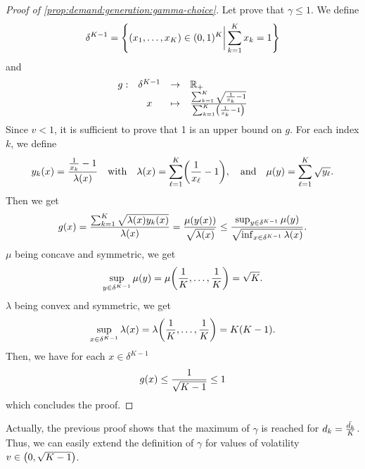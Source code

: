 \begin{proof}[Proof of \cref{prop:demand:generation:gamma-choice}]
Let prove that $\gamma\le 1$.
We define
\begin{equation}
  \delta^{K-1} = \crbracket{\bracket{x_1,\ldots,x_K}\in\bracket{0,1}^K \bigg| \sum_{k=1}^K x_k = 1}
\end{equation}
and
\begin{equation}
  \begin{array}{rccl}
  g: & \delta^{K-1} & \rightarrow & \RR_+ \\
     & x & \mapsto & \frac{\sum_{k=1}^K\sqrt{\frac{1}{x_k}-1}}{\sum_{k=1}^K\bracket{\frac{1}{x_k}-1}}
  \end{array}
\end{equation}
Since $v<1$, it is sufficient to prove that 1 is an upper bound on $g$. For each index $k$, we define
\begin{equation}
  y_k\bracket{x} = \frac{\frac{1}{x_k}-1}{\lambda\bracket{x}}
  \quad\mbox{with}\quad
  \lambda\bracket{x} = \sum_{\ell=1}^K\bracket{\frac{1}{x_{\ell}}-1}
  ,\quad\mbox{and}\quad 
  \mu\bracket{y} = \sum_{\ell=1}^K \sqrt{y_{\ell}}.
\end{equation}
Then we get
\begin{equation}
  g\bracket{x} = \frac{\sum_{k=1}^K\sqrt{\lambda\bracket{x}y_k\bracket{x}}}{\lambda\bracket{x}}
  = \frac{\mu\bracket{y\bracket{x}}}{\sqrt{\lambda\bracket{x}}}
  \le \frac{\sup_{y\in\delta^{K-1}}\mu\bracket{y}}{\sqrt{\inf_{x\in\delta^{K-1}}\lambda\bracket{x}}}.
\end{equation}
$\mu$ being concave and symmetric, we get
\begin{equation}
  \sup_{y\in\delta^{K-1}}\mu\bracket{y} = \mu\bracket{\frac{1}{K},\ldots,\frac{1}{K}} = \sqrt{K}.
\end{equation}
$\lambda$ being convex and symmetric, we get
\begin{equation}
  \sup_{x\in\delta^{K-1}}\lambda\bracket{x} = \lambda\bracket{\frac{1}{K},\ldots,\frac{1}{K}} = K\bracket{K-1}.
\end{equation}
Then, we have for each $x\in\delta^{K-1}$
\begin{equation}
  g\bracket{x} \le \frac{1}{\sqrt{K-1}} \le 1
\end{equation}
which concludes the proof.
\end{proof}


\begin{rmq}
  Actually, the previous proof shows that the maximum of $\gamma$ is reached for $d_k=\frac{\bar{d_k}}{K}$. Thus, we can easily extend the definition of $\gamma$ for values of volatility $v\in\bracket{0,\sqrt{K-1}}$.
\end{rmq}



